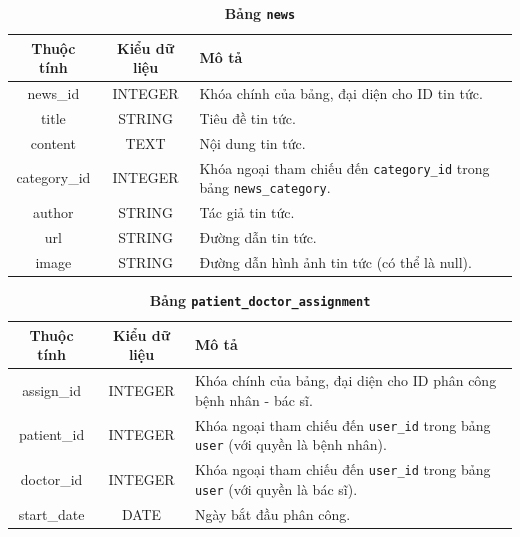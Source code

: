 \documentclass{article}%
\begin{document}
\begin{table}[H]
  \caption{\bfseries \fontsize{12pt}{0pt}\selectfont Bảng \texttt{news}}
  \centering
  \begin{tabularx}{0.9\textwidth}{|c|c|X|}
    \hline
    \textbf{Thuộc tính} & \textbf{Kiểu dữ liệu} & \textbf{Mô tả} \\
    \hline
    news\_id & INTEGER & Khóa chính của bảng, đại diện cho ID tin tức. \\
    \hline
    title & STRING & Tiêu đề tin tức. \\
    \hline
    content & TEXT & Nội dung tin tức. \\
    \hline
    category\_id & INTEGER & Khóa ngoại tham chiếu đến \texttt{category\_id} trong bảng \texttt{news\_category}. \\
    \hline
    author & STRING & Tác giả tin tức. \\
    \hline
    url & STRING & Đường dẫn tin tức. \\
    \hline
    image & STRING & Đường dẫn hình ảnh tin tức (có thể là null). \\
    \hline
  \end{tabularx}
\end{table}

\begin{table}[H]
  \caption{\bfseries \fontsize{12pt}{0pt}\selectfont Bảng \texttt{patient\_doctor\_assignment}}
  \centering
  \begin{tabularx}{0.9\textwidth}{|c|c|X|}
    \hline
    \textbf{Thuộc tính} & \textbf{Kiểu dữ liệu} & \textbf{Mô tả} \\
    \hline
    assign\_id & INTEGER & Khóa chính của bảng, đại diện cho ID phân công bệnh nhân - bác sĩ. \\
    \hline
    patient\_id & INTEGER & Khóa ngoại tham chiếu đến \texttt{user\_id} trong bảng \texttt{user} (với quyền là bệnh nhân). \\
    \hline
    doctor\_id & INTEGER & Khóa ngoại tham chiếu đến \texttt{user\_id} trong bảng \texttt{user} (với quyền là bác sĩ). \\
    \hline
    start\_date & DATE & Ngày bắt đầu phân công. \\
    \hline
  \end{tabularx}
\end{table}
\end{document}

